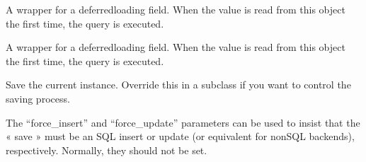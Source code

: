 \documentclass[letterpaper,10pt,french]{sphinxmanual}
\begin{document}
\begin{fulllineitems}
\begin{fulllineitems}
\end{fulllineitems}


\begin{fulllineitems}
\label{\detokenize{main/model:main.models.FicheDePaie.nombreHeureL3}}
\pysigstartsignatures
{}
\pysigstopsignatures
\sphinxAtStartPar
A wrapper for a deferred\sphinxhyphen{}loading field. When the value is read from this
object the first time, the query is executed.

\end{fulllineitems}


\begin{fulllineitems}
\label{\detokenize{main/model:main.models.FicheDePaie.objects}}
\pysigstartsignatures
{}
\pysigstopsignatures
\end{fulllineitems}


\begin{fulllineitems}
\label{\detokenize{main/model:main.models.FicheDePaie.prixUnitaire}}
\pysigstartsignatures
{}
\pysigstopsignatures
\sphinxAtStartPar
A wrapper for a deferred\sphinxhyphen{}loading field. When the value is read from this
object the first time, the query is executed.

\end{fulllineitems}


\begin{fulllineitems}
\label{\detokenize{main/model:main.models.FicheDePaie.save}}
\pysigstartsignatures
{}
\pysigstopsignatures
\sphinxAtStartPar
Save the current instance. Override this in a subclass if you want to
control the saving process.

\sphinxAtStartPar
The “force\_insert” and “force\_update” parameters can be used to insist
that the « save » must be an SQL insert or update (or equivalent for
non\sphinxhyphen{}SQL backends), respectively. Normally, they should not be set.

\end{fulllineitems}


\end{fulllineitems}
\end{document}
